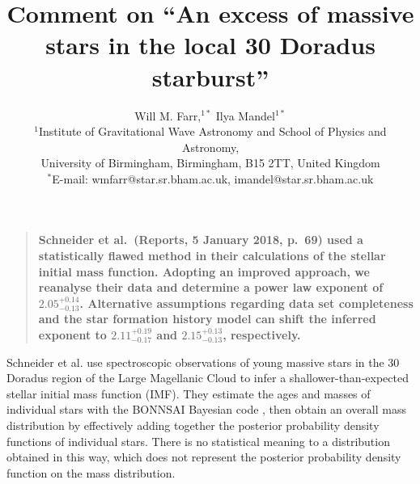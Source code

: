 \documentclass[12pt]{article}
\title{Comment on ``An excess of massive stars in the local 30 Doradus starburst''}
\author{Will M. Farr,$^{1\ast}$ Ilya Mandel$^{1\ast}$\\
\normalsize{$^1$Institute of Gravitational Wave Astronomy and School of Physics and Astronomy,}\\
\normalsize{University of Birmingham, Birmingham, B15 2TT, United Kingdom}\\
\normalsize{$^\ast$E-mail: wmfarr@star.sr.bham.ac.uk, imandel@star.sr.bham.ac.uk}
}
\date{}
\newenvironment{sciabstract}{%
\begin{quote} \bf}
{\end{quote}}
\newcommand{\onesigrange}[3]{\ensuremath{#1^{+#2}_{-#3}}}
\newcommand{\alpharangeone}{\onesigrange{2.05}{0.14}{0.13}}
\newcommand{\alpharangethree}{\onesigrange{2.11}{0.19}{0.17}}
\newcommand{\alpharangefour}{\onesigrange{2.15}{0.13}{0.13}}
\begin{document}
 


\baselineskip24pt


\maketitle 



\begin{sciabstract}
%
%
Schneider et al.~(Reports, 5 January 2018, p.~69) used a statistically flawed method in their calculations of the stellar initial mass function. Adopting an improved approach, we reanalyse their data and determine a power law exponent of $\alpharangeone$. Alternative assumptions regarding data set completeness and the star formation history model can shift the inferred exponent to $\alpharangethree$ and $\alpharangefour$, respectively.
\end{sciabstract}


Schneider et al.\cite{Schneider:2018} use spectroscopic observations of young massive stars in
the 30 Doradus region of the Large Magellanic Cloud to infer a
shallower-than-expected stellar initial mass function (IMF).  They estimate the ages and masses of individual
stars with the BONNSAI Bayesian code \cite{Schneider:2017}, then obtain
an overall mass distribution by effectively adding together the posterior
probability density functions of individual stars.  There is no statistical
meaning to a distribution obtained in this way, which does not represent the
posterior probability density function on the mass distribution.
\end{document}

